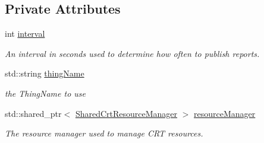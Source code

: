 \subsection*{Private Attributes}
\begin{DoxyCompactItemize}
\item 
\mbox{\label{class_aws_1_1_iot_1_1_device_client_1_1_device_defender_1_1_device_defender_feature_ac3e35348cde1d5d6a9f0d94d401c5be8}} 
int \hyperlink{class_aws_1_1_iot_1_1_device_client_1_1_device_defender_1_1_device_defender_feature_ac3e35348cde1d5d6a9f0d94d401c5be8}{interval}
\begin{DoxyCompactList}\small\item\em An interval in seconds used to determine how often to publish reports. \end{DoxyCompactList}\item 
\mbox{\label{class_aws_1_1_iot_1_1_device_client_1_1_device_defender_1_1_device_defender_feature_a94c232fb069b691c86f50e071be52980}} 
std\+::string \hyperlink{class_aws_1_1_iot_1_1_device_client_1_1_device_defender_1_1_device_defender_feature_a94c232fb069b691c86f50e071be52980}{thing\+Name}
\begin{DoxyCompactList}\small\item\em the Thing\+Name to use \end{DoxyCompactList}\item 
\mbox{\label{class_aws_1_1_iot_1_1_device_client_1_1_device_defender_1_1_device_defender_feature_abe2e798db9d8c78b478441cb95f0ca15}} 
std\+::shared\+\_\+ptr$<$ \hyperlink{class_aws_1_1_iot_1_1_device_client_1_1_shared_crt_resource_manager}{Shared\+Crt\+Resource\+Manager} $>$ \hyperlink{class_aws_1_1_iot_1_1_device_client_1_1_device_defender_1_1_device_defender_feature_abe2e798db9d8c78b478441cb95f0ca15}{resource\+Manager}
\begin{DoxyCompactList}\small\item\em The resource manager used to manage C\+RT resources. \end{DoxyCompactList}\item 
\mbox{\label{class_aws_1_1_iot_1_1_device_client_1_1_device_defender_1_1_device_defender_feature_aa2f55fc2a35b656301cf0039f09bc408}} 

\end{DoxyCompactItemize}
